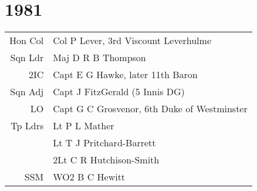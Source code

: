 \chapter*{1981}

\begin{center}
  \small
  \begin{tabular}{rl}
    Hon Col & Col P Lever, 3rd Viscount Leverhulme \\
    Sqn Ldr & Maj D R B Thompson \\
    2IC & Capt E G Hawke, later 11th Baron \\
    Sqn Adj & Capt J FitzGerald (5 Innis DG) \\
    LO & Capt G C Grosvenor, 6th Duke of Westminster \\
    Tp Ldrs & Lt P L Mather \\
      & Lt T J Pritchard-Barrett \\
      & 2Lt C R Hutchison-Smith \\
    SSM & WO2 B C Hewitt \\
  \end{tabular}
\end{center}

